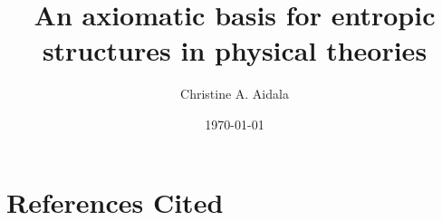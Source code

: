 \documentclass[letterpaper,12pt,prl,tightenlines,onecolumn,notitlepage,longbibliography,floatfix,nofootinbib]{revtex4-2}
\begin{document}
%
%
\title{An axiomatic basis for entropic structures in physical theories}
\date{\today}
\author{Christine A. Aidala}
\maketitle
\newpage
{}

\newpage
\setcounter{page}{0}

\cleardoublepage
%
\cleardoublepage
%
\cleardoublepage
\section{References Cited}

\cleardoublepage
%
%
\end{document}
